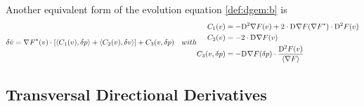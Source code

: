 


Another equivalent form of the evolution equation \eqref{def:dgem:b} is
\begin{subequations}
    \begin{align}
        \vardiff \dot{ v }   &=
        \darg{F}( v ) \mult
        [   \skap{ C_1( v ) }{ \vardiff p }  + 
            \skap{ C_2( v ) }{ \vardiff v }     ]  +
        C_3( v, \vardiff p )
    \end{align}
    with
    \begin{align}
        C_1( v )  &=
        -\diff{2}{\grad{F}}( v )  +
        2 \mult \diff{}{\grad{F}}( \darg{F} ) \mult \diff{2}{F}( v )  \\
        C_2( v )  &=
        -2 \mult \diff{}{\grad{F}}( v )  \\
        C_3( v, \vardiff p )  &=
        - \diff{}{\grad{F}}( \vardiff p ) \mult \frac{ \diff{2}{F}(v ) }{ \skaq{ \grad{F} } }
    \end{align}
\end{subequations}


\subsection{Transversal Directional Derivatives}




